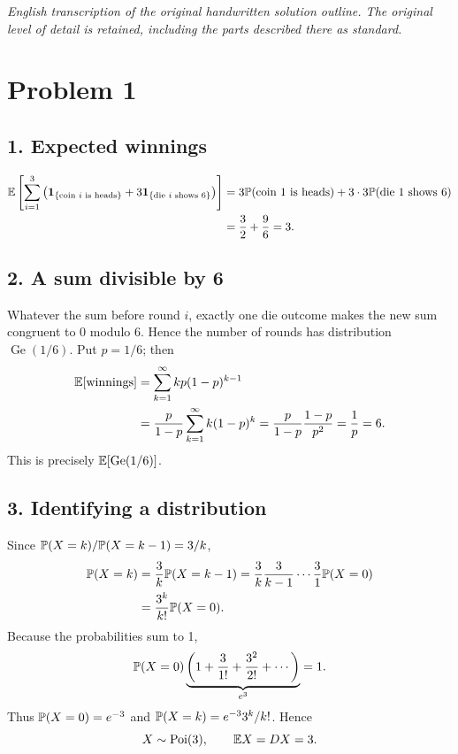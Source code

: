 \documentclass[11pt,a4paper]{article}
\begin{document}
\noindent\emph{English transcription of the original handwritten solution outline. The original level of detail is retained, including the parts described there as standard.}

\section*{Problem 1}
\subsection*{1. Expected winnings}
\begin{align*}
\E\left[\sum_{i=1}^3\left(\mathbf1_{\{\text{coin }i\text{ is heads}\}}
+3\mathbf1_{\{\text{die }i\text{ shows }6\}}\right)\right]
&=3\P(\text{coin 1 is heads})+3\cdot3\P(\text{die 1 shows }6)\\
&=\frac32+\frac96=3.
\end{align*}
\subsection*{2. A sum divisible by 6}
Whatever the sum before round $i$, exactly one die outcome makes the new sum congruent to 0 modulo 6. Hence the number of rounds has distribution $\operatorname{Ge}(1/6)$. Put $p=1/6$; then
\begin{align*}
\E[\text{winnings}]&=\sum_{k=1}^\infty kp(1-p)^{k-1}\\
&=\frac p{1-p}\sum_{k=1}^\infty k(1-p)^k
=\frac p{1-p}\frac{1-p}{p^2}=\frac1p=6.
\end{align*}
This is precisely $\E[\operatorname{Ge}(1/6)]$.

\subsection*{3. Identifying a distribution}
Since $\P(X=k)/\P(X=k-1)=3/k$,
\begin{align*}
\P(X=k)&=\frac3k\P(X=k-1)
=\frac3k\frac3{k-1}\cdots\frac31\P(X=0)\\
&=\frac{3^k}{k!}\P(X=0).
\end{align*}
Because the probabilities sum to 1,
\[
\P(X=0)\underbrace{\left(1+\frac3{1!}+\frac{3^2}{2!}+\cdots\right)}_{e^3}=1.
\]
Thus $\P(X=0)=e^{-3}$ and $\P(X=k)=e^{-3}3^k/k!$. Hence
\[
X\sim\operatorname{Poi}(3),\qquad\E X=DX=3.
\]
\end{document}
